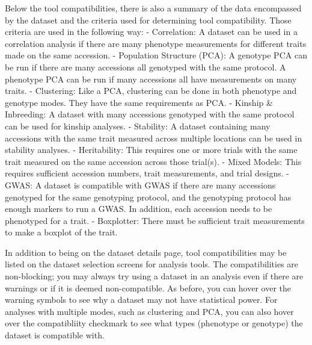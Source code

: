 \documentclass[
  12pt,
]{book}
\begin{document}
Below the tool compatibilities, there is also a summary of the data encompassed by the dataset and the criteria used for determining tool compatibility. Those criteria are used in the following way: - Correlation: A dataset can be used in a correlation analysis if there are many phenotype measurements for different traits made on the same accession. - Population Structure (PCA): A genotype PCA can be run if there are many accessions all genotyped with the same protocol. A phenotype PCA can be run if many accessions all have measurements on many traits. - Clustering: Like a PCA, clustering can be done in both phenotype and genotype modes. They have the same requirements as PCA. - Kinship \& Inbreeding: A dataset with many accessions genotyped with the same protocol can be used for kinship analyses. - Stability: A dataset containing many accessions with the same trait measured across multiple locations can be used in stability analyses. - Heritability: This requires one or more trials with the same trait measured on the same accession across those trial(s). - Mixed Models: This requires sufficient accession numbers, trait measurements, and trial designs. - GWAS: A dataset is compatible with GWAS if there are many accessions genotyped for the same genotyping protocol, and the genotyping protocol has enough markers to run a GWAS. In addition, each accession needs to be phenotyped for a trait. - Boxplotter: There must be sufficient trait measurements to make a boxplot of the trait.

In addition to being on the dataset details page, tool compatibilities may be listed on the dataset selection screens for analysis tools. The compatibilities are non-blocking; you may always try using a dataset in an analysis even if there are warnings or if it is deemed non-compatible. As before, you can hover over the warning symbols to see why a dataset may not have statistical power. For analyses with multiple modes, such as clustering and PCA, you can also hover over the compatibliity checkmark to see what types (phenotype or genotype) the dataset is compatible with.
\end{document}
